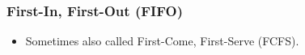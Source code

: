 \begin{frame}

\frametitle{First-In, First-Out (FIFO)}

\begin{itemize}

\item Sometimes also called First-Come, First-Serve (FCFS).

\end{itemize}

\end{frame}
